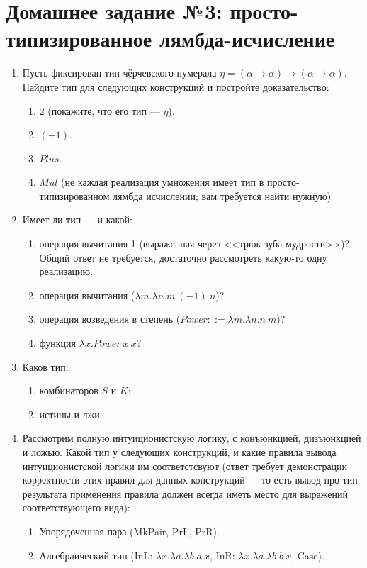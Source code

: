 \documentclass[10pt,a4paper,oneside]{article}
\begin{document}
\section*{Домашнее задание №3: просто-типизированное лямбда-исчисление}
\begin{enumerate}

\item Пусть фиксирован тип чёрчевского нумерала $\eta = (\alpha\rightarrow\alpha) \rightarrow (\alpha\rightarrow\alpha)$. 
Найдите тип для следующих конструкций и постройте доказательство:
\begin{enumerate}
\item $\overline{2}$ (покажите, что его тип --- $\eta$).
\item $(+1)$.
\item $Plus$.
\item $Mul$ (не каждая реализация умножения имеет тип в просто-типизированном лямбда исчислении;
вам требуется найти нужную)
\end{enumerate}

\item Имеет ли тип --- и какой:
\begin{enumerate}
\item операция вычитания 1 (выраженная через <<трюк зуба мудрости>>)? Общий ответ не требуется, 
достаточно рассмотреть какую-то одну реализацию.
\item операция вычитания ($\lambda m.\lambda n.m\ (-1)\ n$)?
\item операция возведения в степень ($Power ::= \lambda m.\lambda n.n\ m$)? 
\item функция $\lambda x.Power\ x\ x$?
\end{enumerate}

\item Каков тип:
\begin{enumerate}
\item комбинаторов $S$ и $K$;
\item истины и лжи.
\end{enumerate}

\item Рассмотрим полную интуиционистскую логику, с конъюнкцией, дизъюнкцией и ложью. Какой тип у следующих конструкций,
и какие правила вывода интуиционистской логики им соответстсвуют (ответ требует демонстрации корректности этих правил
для данных конструкций --- то есть вывод про тип результата применения правила должен всегда иметь место для выражений
соответствующего вида):
\begin{enumerate}
\item Упорядоченная пара (MkPair, PrL, PrR).
\item Алгебраический тип (InL: $\lambda x.\lambda a.\lambda b.a\ x$, InR: $\lambda x.\lambda a.\lambda b.b\ x$, Case).
\end{enumerate}


\end{enumerate}
\end{document}
